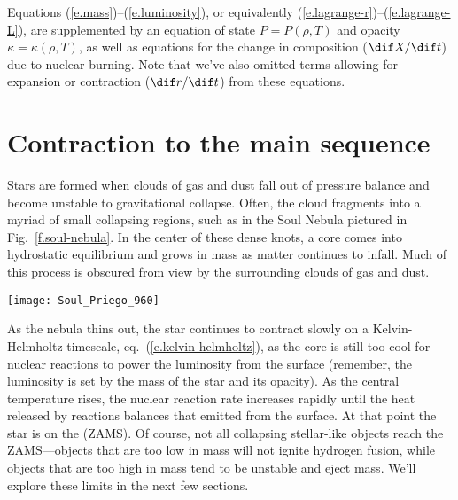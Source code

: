 Equations (\ref{e.mass})--(\ref{e.luminosity}), or equivalently (\ref{e.lagrange-r})--(\ref{e.lagrange-L}), are supplemented by an equation of state $P = P(\rho,T)$ and opacity $\kappa = \kappa(\rho,T)$, as well as equations for the change in composition ($\dif X/\dif t$) due to nuclear burning. Note that we've also omitted terms allowing for expansion or contraction ($\dif r/\dif t$) from these equations.

\section{Contraction to the main sequence}
\label{s.contraction-to-main-sequence}

Stars are formed when clouds of gas and dust fall out of pressure balance and become unstable to gravitational collapse. Often, the cloud fragments into a myriad of small collapsing regions, such as in the Soul Nebula pictured in Fig.~\ref{f.soul-nebula}. In the center of these dense knots, a core comes into hydrostatic equilibrium and grows in mass as matter continues to infall. Much of this process is obscured from view by the surrounding clouds of gas and dust.
\begin{marginfigure}
\texttt{[image: Soul\_Priego\_960]}
\caption[Soul Nebula]{\label{f.soul-nebula} Image of the Soul Nebula (IC 1848) in the constellation Cassiopeia. Credit: Jos\'e Jim\'enez Priego (Astromet).}
\end{marginfigure}

As the nebula thins out, the star continues to contract slowly on a Kelvin-Helmholtz timescale, eq.~(\ref{e.kelvin-helmholtz}), as the core is still too cool for nuclear reactions to power the luminosity from the surface (remember, the luminosity is set by the mass of the star and its opacity). As the central temperature rises, the nuclear reaction rate increases rapidly until the heat released by reactions balances that emitted from the surface. At that point the star is on the  (ZAMS). Of course, not all collapsing stellar-like objects reach the ZAMS---objects that are too low in mass will not ignite hydrogen fusion, while objects that are too high in mass tend to be unstable and eject mass. We'll explore these limits in the next few sections.

